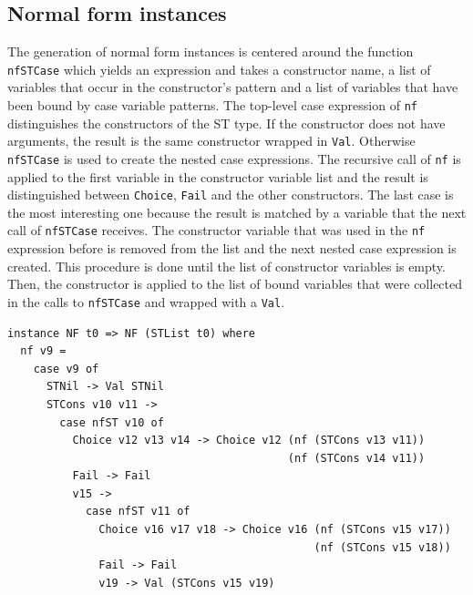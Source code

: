 \documentclass[a4paper, 11pt, fleqn]{scrreprt}
\newcommand{\cinline}[1]{\texttt{#1}}
\begin{document}
\subsection{Normal form instances}
The generation of normal form instances is centered around the function \cinline{nfSTCase} which yields an expression and takes a constructor name, a list of variables that occur in the constructor's pattern and a list of variables that have been bound by case variable patterns. The top-level case expression of \cinline{nf} distinguishes the constructors of the ST type. If the constructor does not have arguments, the result is the same constructor wrapped in \cinline{Val}. Otherwise \cinline{nfSTCase} is used to create the nested case expressions. The recursive call of \cinline{nf} is applied to the first variable in the constructor variable list and the result is distinguished between \cinline{Choice}, \cinline{Fail} and the other constructors.
The last case is the most interesting one because the result is matched by a variable that the next call of \cinline{nfSTCase} receives. The constructor variable that was used in the \cinline{nf} expression before is removed from the list and the next nested case expression is created. This procedure is done until the list of constructor variables is empty. Then, the constructor is applied to the list of bound variables that were collected in the calls to \cinline{nfSTCase} and wrapped with a \cinline{Val}.
\begin{verbatim}
instance NF t0 => NF (STList t0) where
  nf v9 =
    case v9 of
      STNil -> Val STNil
      STCons v10 v11 ->
        case nfST v10 of
          Choice v12 v13 v14 -> Choice v12 (nf (STCons v13 v11))
                                           (nf (STCons v14 v11))
          Fail -> Fail
          v15 ->
            case nfST v11 of
              Choice v16 v17 v18 -> Choice v16 (nf (STCons v15 v17))
                                               (nf (STCons v15 v18))
              Fail -> Fail
              v19 -> Val (STCons v15 v19)
\end{verbatim}
\end{document}
